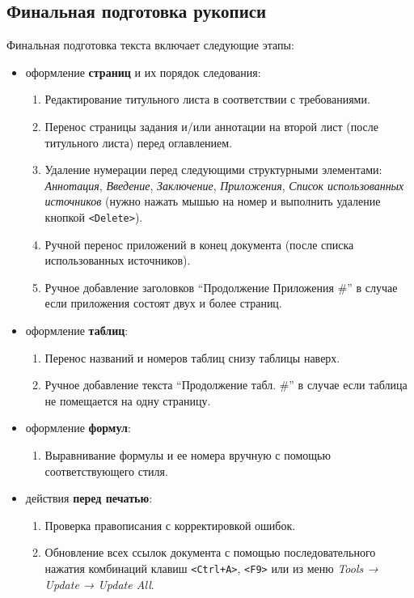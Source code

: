 \documentclass[
  a4paper,
]{book}
\providecommand{\tightlist}{%
  \setlength{\itemsep}{0pt}\setlength{\parskip}{0pt}}
\theoremstyle{definition}
\theoremstyle{definition}
\theoremstyle{definition}
\theoremstyle{definition}
\theoremstyle{remark}
\begin{document}
\hypertarget{authoring-odt-final}{%
\subsection{Финальная подготовка рукописи}\label{authoring-odt-final}}

Финальная подготовка текста включает следующие этапы:

\begin{itemize}
\item
  оформление \textbf{страниц} и их порядок следования:

  \begin{enumerate}
  \def\labelenumi{\arabic{enumi}.}
  \tightlist
  \item
    Редактирование титульного листа в соответствии с требованиями.
  \item
    Перенос страницы задания и/или аннотации на второй лист (после титульного листа) перед оглавлением.
  \item
    Удаление нумерации перед следующими структурными элементами: \emph{Аннотация}, \emph{Введение}, \emph{Заключение}, \emph{Приложения}, \emph{Список использованных источников} (нужно нажать мышью на номер и выполнить удаление кнопкой \texttt{\textless{}Delete\textgreater{}}).
  \item
    Ручной перенос приложений в конец документа (после списка использованных источников).
  \item
    Ручное добавление заголовков ``Продолжение Приложения \#'' в случае если приложения состоят двух и более страниц.
  \end{enumerate}
\item
  оформление \textbf{таблиц}:

  \begin{enumerate}
  \def\labelenumi{\arabic{enumi}.}
  \tightlist
  \item
    Перенос названий и номеров таблиц снизу таблицы наверх.
  \item
    Ручное добавление текста ``Продолжение табл. \#'' в случае если таблица не помещается на одну страницу.
  \end{enumerate}
\item
  оформление \textbf{формул}:

  \begin{enumerate}
  \def\labelenumi{\arabic{enumi}.}
  \tightlist
  \item
    Выравнивание формулы и ее номера вручную с помощью соответствующего стиля.
  \end{enumerate}
\item
  действия \textbf{перед печатью}:

  \begin{enumerate}
  \def\labelenumi{\arabic{enumi}.}
  \tightlist
  \item
    Проверка правописания с корректировкой ошибок.
  \item
    Обновление всех ссылок документа с помощью последовательного нажатия комбинаций клавиш \texttt{\textless{}Ctrl+A\textgreater{}}, \texttt{\textless{}F9\textgreater{}} или из меню \emph{Tools → Update → Update All}.
  \end{enumerate}
\end{itemize}
\end{document}
